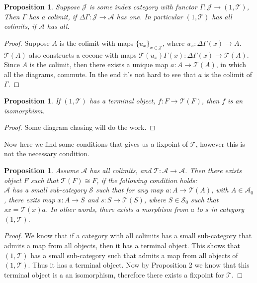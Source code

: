 \documentclass[12pt]{article}
\newcounter{the}
\newtheorem{proposition}[the]{Proposition}
\begin{document}
\begin{proposition}
    Suppose $\mathscr J$ is some index category with functor $\Gamma: \mathscr J \to (1, \mathscr T)$, Then $\Gamma$ has a colimit, if $\Delta \Gamma: \mathscr J \to \mathscr A$ has one. In particular $(1, \mathscr T)$ has all colimits, if $\mathscr A$ has all. 
\end{proposition}
\begin{proof}
    Suppose $A$ is the colimit with maps $\{u_x\}_{x \in \mathscr J}$, where $u_x: \Delta \Gamma (x) \to A$. $\mathscr T(A)$ also constructs a cocone with maps $\mathscr T(u_x) \Gamma (x): \Delta \Gamma (x) \to \mathscr T(A)$. Since $A$ is the colimit, then there exists a unique map $a: A \to \mathscr T(A)$, in which all the diagrams, commute. In the end it's not hard to see that $a$ is the colimit of $\Gamma$.
\end{proof}

\begin{proposition}
    If $(1, \mathscr T)$ has a terminal object, $f: F \to \mathscr T(F)$, then $f$ is an isomorphism.
\end{proposition}
\begin{proof}
    Some diagram chasing will do the work. 
\end{proof}

Now here we find some conditions that gives us a fixpoint of $\mathscr T$, however this is not the necessary condition.

\begin{proposition}
    Assume $\mathscr A$ has all colimits, and $\mathscr T: \mathscr A \to \mathscr A$. Then there exists object $F$ such that $\mathscr T(F) \cong F$, if the following condition holds: \\
    $\mathscr A$ has a small sub-category $\mathscr S$ such that for any map $a: A \to \mathscr T(A)$, with $A \in \mathscr A_0$, there exits map $x: A \to S$ and $s: S \to \mathscr T(S)$, where $S \in \mathscr S_0$ such that $sx = \mathscr T(x) a$. In other words, there exists a morphism from $a$ to $s$ in category $(1, \mathscr T)$.
\end{proposition}
\begin{proof}
    We know that if a category with all colimits has a small sub-category that admits a map from all objects, then it has a terminal object. This shows that $(1, \mathscr T)$ has a small sub-category such that admits a map from all objects of $(1, \mathscr T)$. Thus it has a terminal object. Now by Proposition 2 we know that this terminal object is a an isomorphism, therefore there exists a fixpoint for $\mathscr T$.
\end{proof}
\end{document}
